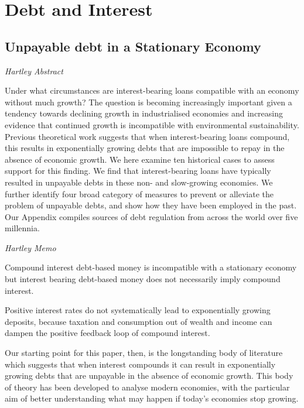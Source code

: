 \documentclass[
]{book}
\begin{document}
\hypertarget{debt-and-interest}{%
\chapter{Debt and Interest}\label{debt-and-interest}}

\hypertarget{unpayable-debt-in-a-stationary-economy}{%
\section{Unpayable debt in a Stationary Economy}\label{unpayable-debt-in-a-stationary-economy}}

\emph{Hartley Abstract}

Under what circumstances are interest-bearing loans compatible with an economy without much growth? The question is becoming increasingly important given a tendency towards declining growth in industrialised economies and increasing evidence that continued growth is incompatible with environmental sustainability. Previous theoretical work suggests that when interest-bearing loans compound, this results in exponentially growing debts that are impossible to repay in the absence of economic growth. We here examine ten historical cases to assess support for this finding. We find that interest-bearing loans have typically resulted in unpayable debts in these non- and slow-growing economies. We further identify four broad category of measures to prevent or alleviate the problem of unpayable debts, and show how they have been employed in the past. Our Appendix compiles sources of debt regulation from across the world over five millennia.

\emph{Hartley Memo}

Compound interest debt-based money is incompatible with a
stationary economy but interest bearing debt-based money does not
necessarily imply compound interest.

Positive interest
rates do not systematically lead to exponentially growing deposits,
because taxation and consumption out of wealth and income can
dampen the positive feedback loop of compound interest.

Our starting point for this paper, then, is the longstanding body of
literature which suggests that when interest compounds it can result in
exponentially growing debts that are unpayable in the absence of
economic growth. This body of theory has been developed to analyse
modern economies, with the particular aim of better understanding
what may happen if today's economies stop growing.
\end{document}
